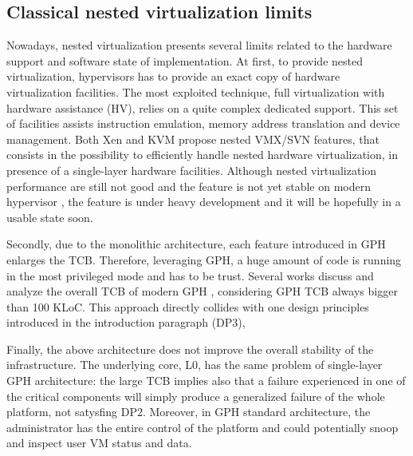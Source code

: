 \documentclass{acm_proc_article-sp} %
\begin{document}
\subsection{Classical nested virtualization limits}

Nowadays, nested virtualization presents several limits related to the hardware support and software state of implementation. At first, to provide nested virtualization, hypervisors has to provide an exact copy of hardware virtualization facilities. The most exploited technique, full virtualization with hardware assistance (HV), relies on a quite complex dedicated support.
This set of facilities assists instruction emulation, memory address translation and device management. Both Xen and KVM propose nested VMX/SVN features, that consists in the possibility to efficiently handle nested hardware virtualization, in presence of a single-layer hardware facilities.
Although nested virtualization performance are still not good and the feature is not yet stable on modern hypervisor \cite{xen:test}, the feature is under heavy development and it will be hopefully in a usable state soon.

Secondly, due to the monolithic architecture, each feature introduced in GPH enlarges the TCB. Therefore, leveraging GPH, a huge amount of code is running in the most privileged mode and has to be trust. Several works discuss and analyze the overall TCB of modern GPH \cite{nova, xmhf}, considering GPH TCB always bigger than 100 KLoC. This approach directly collides with one design principles introduced in the introduction paragraph (DP3), 

Finally, the above architecture does not improve the overall stability of the infrastructure. The underlying core, L0, has the same problem of single-layer GPH architecture: the large TCB implies also that a failure experienced in one of the critical components will simply produce a generalized failure of the whole platform, not satysfing DP2. Moreover, in GPH standard architecture, the administrator has the entire control of the platform and could potentially snoop and inspect user VM status and data.
\end{document}
